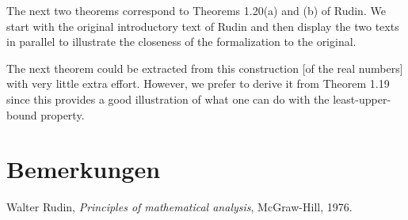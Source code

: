 \documentclass{article}
\begin{document}
\newpage
The next two theorems correspond to Theorems 1.20(a) and (b) of Rudin. We start with the original introductory text of Rudin and then display the two texts in parallel to illustrate the closeness of the formalization to the original.

\vspace{1cm}

The next theorem could be extracted from this construction [of the real numbers] with very little extra effort. However, we prefer to derive it from Theorem 1.19 since this provides a good illustration of what one can do with the least-upper-bound property.


\newpage


\section{Bemerkungen}







\begin{thebibliography}{1}

  Walter Rudin,
  \textit{Principles of mathematical analysis},
  McGraw-Hill,
  1976.

\end{thebibliography}
  
\end{document}
